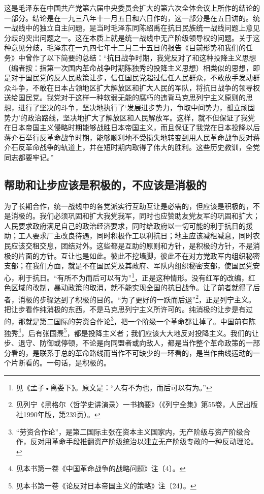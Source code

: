 \documentclass[cn,11pt,chinese]{elegantbook}
\def\myformat#1{\hfil\hfil #1}
\begin{document}
\begin{introduction}\item  这是毛泽东在中国共产党第六届中央委员会扩大的第六次全体会议上所作的结论的一部分。结论是在一九三八年十一月五日和六日作的，这一部分是在五日讲的。统一战线中的独立自主问题，是当时毛泽东同陈绍禹在抗日民族统一战线问题上意见分歧的突出问题之一。这在本质上就是统一战线中无产阶级领导权的问题。关于这种意见分歧，毛泽东在一九四七年十二月二十五日的报告《目前形势和我们的任务》中曾作了以下简要的总结：“抗日战争时期，我党反对了和这种投降主义思想（编者按：指第一次国内革命战争时期陈独秀的投降主义思想）相类似的思想，即是对于国民党的反人民政策让步，信任国民党超过信任人民群众，不敢放手发动群众斗争，不敢在日本占领地区扩大解放区和扩大人民的军队，将抗日战争的领导权送给国民党。我党对于这样一种软弱无能的腐朽的违背马克思列宁主义原则的思想，进行了坚决的斗争，坚决地执行了‘发展进步势力，争取中间势力，孤立顽固势力’的政治路线，坚决地扩大了解放区和人民解放军。这样，就不但保证了我党在日本帝国主义侵略时期能够战胜日本帝国主义，而且保证了我党在日本投降以后蒋介石举行反革命战争时期，能够顺利地不受损失地转变到用人民革命战争反对蒋介石反革命战争的轨道上，并在短时期内取得了伟大的胜利。这些历史教训，全党同志都要牢记。”\end{introduction}
\subsection*{\myformat{帮助和让步应该是积极的，不应该是消极的}}
为了长期合作，统一战线中的各党派实行互助互让是必需的，但应该是积极的，不是消极的。我们必须巩固和扩大我党我军，同时也应赞助友党友军的巩固和扩大；人民要求政府满足自己的政治经济要求，同时给政府以一切可能的利于抗日的援助；工人要求厂主改良待遇，同时积极作工以利抗日；地主应该减租减息，同时农民应该交租交息，团结对外。这些都是互助的原则和方针，是积极的方针，不是消极的片面的方针。互让也是如此。彼此不挖墙脚，彼此不在对方党政军内组织秘密支部；在我们方面，就是不在国民党及其政府、军队内组织秘密支部，使国民党安心，利于抗日。“有所不为而后可以有为”\footnote[1]{ 见《孟子•离娄下》。原文是：“人有不为也，而后可以有为。”}，正是这种情形。没有红军的改编，红色区域的改制，暴动政策的取消，就不能实现全国的抗日战争。让了前者就得了后者，消极的步骤达到了积极的目的。“为了更好的一跃而后退”\footnote[2]{ 见列宁《黑格尔〈哲学史讲演录〉一书摘要》（《列宁全集》第55卷，人民出版社1990年版，第239页）。}，正是列宁主义。把让步看作纯消极的东西，不是马克思列宁主义所许可的。纯消极的让步是有过的，那就是第二国际的劳资合作论\footnote[3]{ “劳资合作论”，是第二国际主张在资本主义国家内，无产阶级与资产阶级合作，反对用革命手段推翻资产阶级统治以建立无产阶级专政的一种反动理论。}，把一个阶级一个革命都让掉了。中国前有陈独秀\footnote[4]{ 见本书第一卷《中国革命战争的战略问题》注〔4〕。}，后有张国焘\footnote[5]{ 见本书第一卷《论反对日本帝国主义的策略》注〔24〕。}，都是投降主义者；我们应该大大地反对投降主义。我们的让步、退守、防御或停顿，不论是向同盟者或向敌人，都是当作整个革命政策的一部分看的，是联系于总的革命路线而当作不可缺少的一环看的，是当作曲线运动的一个片断看的。一句话，是积极的。\\
\end{document}
